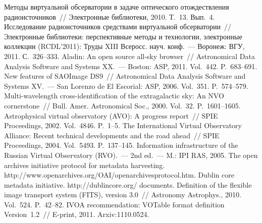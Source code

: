 \begin{multicols}{2}
{{\begin{thebibliography}{99}
Методы виртуальной 
обсерватории в задаче оптического отождествления радиоисточников~// Электронные 
библиотеки, 2010. Т.~13. Вып.~4. 
 Исследование радиоисточников средствами виртуальной 
обсерватории~// Электронные библиотеки: перспективные методы и технологии, 
электронные коллекции (RCDL'2011): Труды \mbox{XIII} Всеросс. науч. конф.~--- 
Воронеж: ВГУ, 2011. С.~326--333. 
Aladin: An open source all-sky browser~// 
Astronomical Data Analysis Software and Systems XX.~--- Boston: ASP, 2011. Vol.~442. P.~683--691. 
New features of SAOImage DS9~// Astronomical Data Analysis Software and 
Systems XV.~--- San Lorenzo de El Escorial: ASP, 2006. Vol.~351. P.~574--579. 
 Multi-wavelength cross-identification of the extragalactic sky: An NVO cornerstone~// Bull. 
Amer. Astronomical Soc., 2000. Vol.~32. P.~1601--1605.
Astrophysical 
virtual observatory (AVO): A progress report~// SPIE Proceedings, 2002. Vol.~4846. P.~1--5.
The International Virtual Observatory Alliance: Recent technical developments and the road ahead~// 
SPIE Proceedings, 2004. Vol.~5493. P.~137--145.
{Information infrastructure 
of the Russian Virtual Observatory (RVO)}.~--- 2nd ed.~--- M.: IPI RAS, 2005.
The open archives initiative protocol for metadata harvesting. 
{\sf http://www.openarchives.org/OAI/\linebreak openarchivesprotocol.htm}.
Dublin core metadata initiative. {\sf http://dublincore.org/ documents}.
Definition of the flexible 
image transport system (FITS), version 3.0~// Astronomy Astrophys., 2010. Vol.~524. P.~42--82.
 IVOA  recommendation: VOTable format definition Version~1.2~// E-print, 2011. Arxiv:1110.0524. 

\end{thebibliography}}}
\end{multicols}
